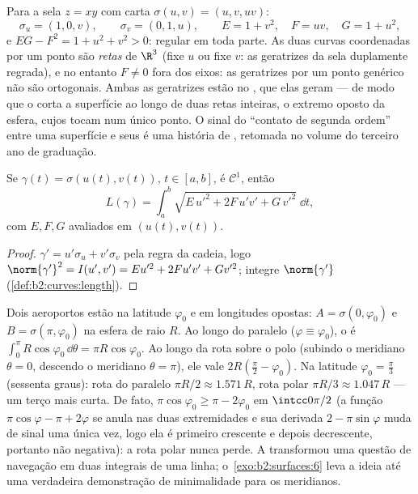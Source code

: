 \begin{example}\label{ex:b2:surfaces:saddlechart}
Para a sela $z = xy$ com carta $\sigma(u, v) = (u, v,
uv)$:
\[
\sigma_u = (1, 0, v), \qquad \sigma_v = (0, 1, u),
\qquad
E = 1 + v^2, \quad F = uv, \quad G = 1 + u^2 ,
\]
e $EG - F^2 = 1 + u^2 + v^2 > 0$: regular em toda parte. As
duas curvas coordenadas por um ponto são \emph{retas}
de $\R^3$ (fixe $u$ ou fixe $v$: as geratrizes da
sela duplamente regrada), e no entanto $F \neq 0$ fora dos eixos: as geratrizes
por um ponto genérico não são ortogonais. Ambas as geratrizes estão
no , que elas geram --- de modo que o  corta a superfície ao longo de duas retas inteiras, o extremo
oposto da esfera, cujos  tocam num único
ponto. O sinal do ``contato de segunda ordem'' entre
uma superfície e seus  é uma história de ,
retomada no volume do terceiro ano de graduação.
\end{example}

\begin{proposition}\label{prop:b2:surfaces:curvelength}
Se $\gamma(t) = \sigma(u(t), v(t))$, $t \in [a, b]$, é
$\mathcal{C}^1$, então
\[
L(\gamma) = \int_a^b
\sqrt{E\,u'^2 + 2F\,u'v' + G\,v'^2}\;\dd t ,
\]
com $E, F, G$ avaliados em $(u(t), v(t))$.
\end{proposition}

\begin{proof}
$\gamma' = u'\sigma_u + v'\sigma_v$ pela regra da cadeia, logo
$\norm{\gamma'}^2 = I(u', v') = Eu'^2 + 2Fu'v' + Gv'^2$; integre
$\norm{\gamma'}$ (\cref{def:b2:curves:length}).
\end{proof}

\begin{example}\label{ex:b2:surfaces:polarroute}
Dois aeroportos estão na latitude $\varphi_0$ e em longitudes
opostas: $A = \sigma(0, \varphi_0)$ e $B = \sigma(\pi,
\varphi_0)$ na esfera de raio $R$. Ao longo do paralelo
($\varphi \equiv \varphi_0$), o  é
$\int_0^\pi R\cos\varphi_0\,\dd\theta = \pi R\cos\varphi_0$.
Ao longo da rota sobre o polo (subindo o meridiano $\theta = 0$,
descendo o meridiano $\theta = \pi$), ele vale $2R(\frac\pi2 -
\varphi_0)$. Na latitude $\varphi_0 = \frac\pi3$ (sessenta
graus): rota do paralelo $\pi R/2 \approx 1.571\,R$, rota
polar $\pi R/3 \approx 1.047\,R$ --- um terço mais curta. De fato,
$\pi\cos\varphi_0 \geq \pi - 2\varphi_0$ em
$\intcc0{\pi/2}$ (a função $\pi\cos\varphi - \pi +
2\varphi$ se anula nas duas extremidades e sua derivada $2 -
\pi\sin\varphi$ muda de sinal uma única vez, logo ela é primeiro crescente
e depois decrescente, portanto não negativa): a rota polar nunca
perde. A  transformou uma questão de navegação
em duas integrais de uma linha; o~\cref{exo:b2:surfaces:6} leva
a ideia até uma verdadeira demonstração de minimalidade para os meridianos.
\end{example}

